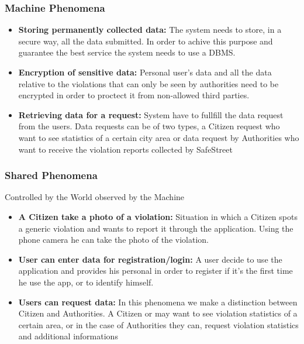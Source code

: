 \documentclass{article}
\begin{document}
\subsubsection{Machine Phenomena}
\begin{itemize}
    
\item \textbf{Storing permanently collected data:}
The system needs to store, in a secure way, all the data submitted.
In order to achive this purpose and guarantee the best service
the system needs to use a DBMS.

\item \textbf{Encryption of sensitive data:}
Personal user's data and all the data relative to the violations
that can only be seen by authorities need to be encrypted in order
to proctect it from non-allowed third parties. 

\item \textbf{Retrieving data for a request:}
System have to fullfill the data request from the users. Data 
requests can be of two types, a Citizen request who want to see
statistics of a certain city area or data request by Authorities
who want to receive the violation reports collected by SafeStreet
\end{itemize}

\subsubsection{Shared Phenomena}
Controlled by the World observed by the Machine
\begin{itemize}
    \item \textbf{A Citizen take a photo of a violation:}
    Situation in which a Citizen spots a generic violation and wants
    to report it through the application. Using the phone camera he
    can take the photo of the violation.

    \item \textbf{User can enter data for registration/login:}
    A user decide to use the application and provides his personal 
    in order to register if it's the first time he use the app, or to
    identify himself.

    \item \textbf{Users can request data:}
    In this phenomena we make a distinction between Citizen and Authorities.
    A Citizen or may want to see violation statistics 
    of a certain area, or in the case of Authorities they can, request
    violation statistics and additional informations 
\end{itemize}
\end{document}
